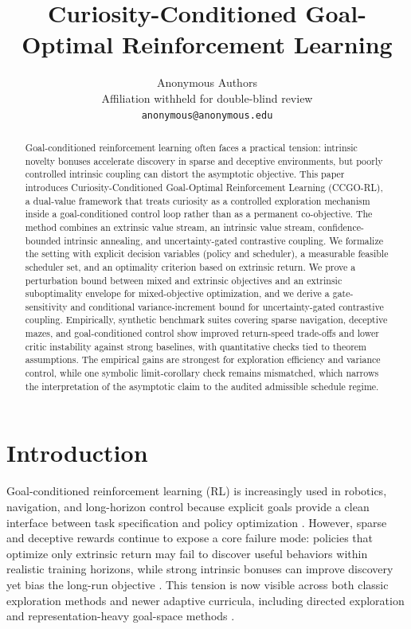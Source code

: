 \documentclass{article} %
\title{Curiosity-Conditioned Goal-Optimal Reinforcement Learning}
\author{Anonymous Authors \\
Affiliation withheld for double-blind review \\
\texttt{anonymous@anonymous.edu}}
\begin{document}
\maketitle

\begin{abstract}
Goal-conditioned reinforcement learning often faces a practical tension: intrinsic novelty bonuses accelerate discovery in sparse and deceptive environments, but poorly controlled intrinsic coupling can distort the asymptotic objective. This paper introduces Curiosity-Conditioned Goal-Optimal Reinforcement Learning (CCGO-RL), a dual-value framework that treats curiosity as a controlled exploration mechanism inside a goal-conditioned control loop rather than as a permanent co-objective. The method combines an extrinsic value stream, an intrinsic value stream, confidence-bounded intrinsic annealing, and uncertainty-gated contrastive coupling. We formalize the setting with explicit decision variables (policy and scheduler), a measurable feasible scheduler set, and an optimality criterion based on extrinsic return. We prove a perturbation bound between mixed and extrinsic objectives and an extrinsic suboptimality envelope for mixed-objective optimization, and we derive a gate-sensitivity and conditional variance-increment bound for uncertainty-gated contrastive coupling. Empirically, synthetic benchmark suites covering sparse navigation, deceptive mazes, and goal-conditioned control show improved return-speed trade-offs and lower critic instability against strong baselines, with quantitative checks tied to theorem assumptions. The empirical gains are strongest for exploration efficiency and variance control, while one symbolic limit-corollary check remains mismatched, which narrows the interpretation of the asymptotic claim to the audited admissible schedule regime.
\end{abstract}


\section{Introduction}
\label{sec:introduction}

Goal-conditioned reinforcement learning (RL) is increasingly used in robotics, navigation, and long-horizon control because explicit goals provide a clean interface between task specification and policy optimization \citep{ref_universal_value_function_approximators_2015, arxiv1707_01495, arxiv2206_07568}. However, sparse and deceptive rewards continue to expose a core failure mode: policies that optimize only extrinsic return may fail to discover useful behaviors within realistic training horizons, while strong intrinsic bonuses can improve discovery yet bias the long-run objective \citep{arxiv1606_01868, arxiv1705_05363, arxiv1810_12894, arxiv2002_06038}. This tension is now visible across both classic exploration methods and newer adaptive curricula, including directed exploration and representation-heavy goal-space methods \citep{arxiv2003_13350, arxiv2505_19850, arxiv2603_14887, arxiv2603_02104, arxiv2602_24081}.
\end{document}
